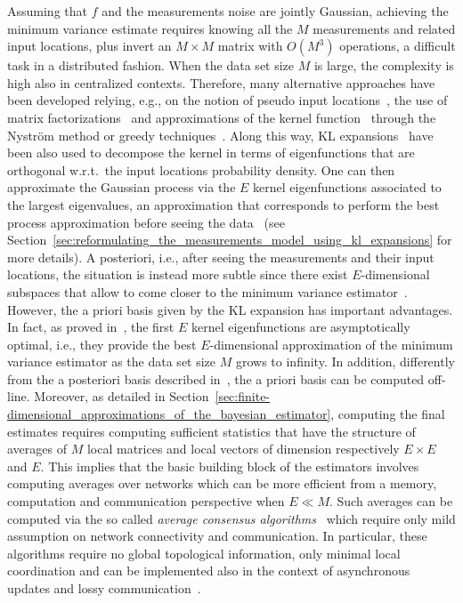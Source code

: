 \documentclass[10pt,twocolumn,twoside]{IEEEtran}					%
\theoremstyle	{plain}
\newcommand	{\Section}				[0]	{Section}
\begin{document}
Assuming that $f$ and the measurements noise are jointly Gaussian, achieving the minimum variance estimate requires knowing all the $M$ measurements and related input locations, plus invert an $M \times M$ matrix with $O(M^3)$ operations, a difficult task in a distributed fashion. When the data set size $M$ is large, the complexity is high also in centralized contexts. Therefore, many alternative approaches have been developed relying, e.g., on the notion of pseudo input locations~\cite{Qui2005,Snelson06sG,Laz2010}, the use of matrix factorizations~\cite{Ambi2016} and approximations of the kernel function~\cite{BachLowRank05,KulisLowRank06} through the Nystr\"{o}m method or greedy techniques~\cite{Williams2001,ZhangNistrom10,SmolaGeedy2000}. Along this way, \ac{KL} expansions~\cite{levy2008karhunen} have been also used to decompose the kernel in terms of eigenfunctions that are orthogonal w.r.t.\ the input locations probability density. One can then approximate the Gaussian process via the $E$ kernel eigenfunctions associated to the largest eigenvalues, an approximation that corresponds to perform the best process approximation before seeing the data~\cite{levy2008karhunen} (see \Section~\ref{sec:reformulating_the_measurements_model_using_kl_expansions} for more details). A posteriori, i.e., after seeing the measurements and their input locations, the situation is instead more subtle since there exist $E$-dimensional subspaces that allow to come closer to the minimum variance estimator~\cite{ferrari_trecate_et_al__1999__finite-dimensional_approximation_of_gaussian_processes}. However, the a priori basis given by the \ac{KL} expansion has important advantages. In fact, as proved in~\cite{zhu_et_al__1998__gaussian_regression_and_optimal_finite_dimensional_linear_models}, the first $E$ kernel eigenfunctions are asymptotically optimal, i.e., they provide the best $E$-dimensional approximation of the minimum variance estimator as the data set size $M$ grows to infinity. In addition, differently from the a posteriori basis described in~\cite{ferrari_trecate_et_al__1999__finite-dimensional_approximation_of_gaussian_processes}, the a priori basis can be computed off-line.
%
Moreover, as detailed in \Section~\ref{sec:finite-dimensional_approximations_of_the_bayesian_estimator}, computing the final estimates requires computing sufficient statistics that have the structure of averages of $M$ local matrices and local vectors of dimension respectively $E \times E$ and $E$. This implies that the basic building block of the estimators involves computing averages over networks which can be more efficient from a memory, computation and communication perspective when $E \ll M$. Such averages can be computed via the so called \emph{average consensus algorithms}~\cite{Xiao:04,garin2010survey} which require only mild assumption on network connectivity and communication. In particular, these algorithms require no global topological information, only minimal local coordination and can be implemented also in the context of asynchronous updates and lossy communication~\cite{Bof:17}. 
\end{document}
